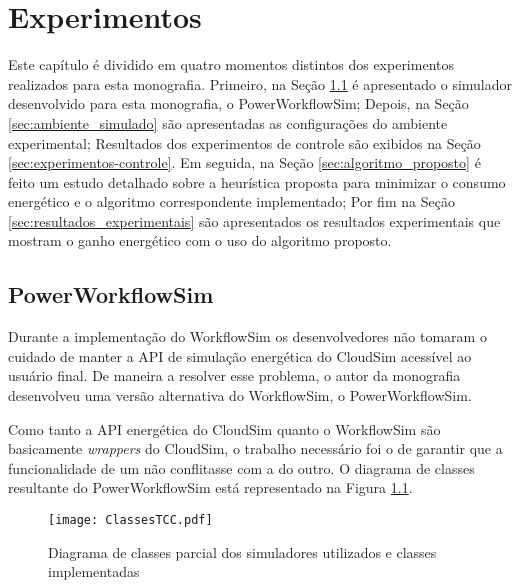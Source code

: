 \chapter{Experimentos}
\label{cap:experimentos}
Este capítulo é dividido em quatro momentos distintos dos experimentos realizados
para esta monografia. Primeiro, na Seção \ref{sec:powerworkflowsim} é
apresentado o simulador desenvolvido para esta monografia, o PowerWorkflowSim;
Depois, na Seção \ref{sec:ambiente_simulado} são
apresentadas as configurações do ambiente experimental; Resultados dos 
experimentos de controle são exibidos na Seção \ref{sec:experimentos-controle}.
Em seguida, na Seção
\ref{sec:algoritmo_proposto} é feito um estudo detalhado sobre a heurística
proposta para minimizar o consumo energético e o algoritmo correspondente
implementado; Por fim na Seção \ref{sec:resultados_experimentais} são
apresentados os resultados experimentais que mostram o ganho energético com
o uso do algoritmo proposto.

\section{PowerWorkflowSim}
\label{sec:powerworkflowsim}
Durante a implementação do WorkflowSim os desenvolvedores não tomaram o cuidado
de manter a API de simulação energética do CloudSim acessível ao usuário final.
De maneira a resolver esse problema, o autor da monografia desenvolveu uma versão
alternativa do WorkflowSim, o PowerWorkflowSim.

Como tanto a API energética do CloudSim quanto o WorkflowSim são basicamente 
\emph{wrappers} do CloudSim, o trabalho necessário foi o de garantir que 
a funcionalidade de um não conflitasse com a do outro. O diagrama de classes
resultante do PowerWorkflowSim está representado na Figura
\ref{fig:classes_powerworkflowsim}.

\begin{figure}[ht]
\centering
\texttt{[image: ClassesTCC.pdf]}
\caption{Diagrama de classes parcial dos simuladores utilizados e classes
implementadas}
\label{fig:classes_powerworkflowsim}
\end{figure}


